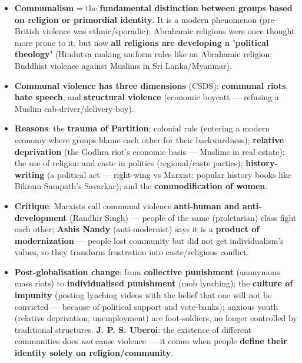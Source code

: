 \begin{KeyConcept}
\begin{itemize}
\item \textbf{Communalism} = the \textbf{fundamental distinction between groups based on religion or primordial identity}. It is a modern phenomenon (pre-British violence was ethnic/sporadic); Abrahamic religions were once thought more prone to it, but now \textbf{all religions are developing a 'political theology'} (Hindutva making uniform rules like an Abrahamic religion; Buddhist violence against Muslims in Sri Lanka/Myanmar).
\item \textbf{Communal violence has three dimensions} (CSDS): \textbf{communal riots}, \textbf{hate speech}, and \textbf{structural violence} (economic boycott --- refusing a Muslim cab-driver/delivery-boy).
\item \textbf{Reasons}: the \textbf{trauma of Partition}; colonial rule (entering a modern economy where groups blame each other for their backwardness); \textbf{relative deprivation} (the Godhra riot's economic basis --- Muslims in real estate); the use of religion and caste in politics (regional/caste parties); \textbf{history-writing} (a political act --- right-wing vs Marxist; popular history books like Bikram Sampath's Savarkar); and the \textbf{commodification of women}.
\item \textbf{Critique}: Marxists call communal violence \textbf{anti-human and anti-development} (Randhir Singh) --- people of the same (proletarian) class fight each other; \textbf{Ashis Nandy} (anti-modernist) says it is a \textbf{product of modernization} --- people lost community but did not get individualism's values, so they transform frustration into caste/religious conflict.
\item \textbf{Post-globalisation change}: from \textbf{collective punishment} (anonymous mass riots) to \textbf{individualised punishment} (mob lynching); the \textbf{culture of impunity} (posting lynching videos with the belief that one will not be convicted --- because of political support and vote-banks); anxious youth (relative deprivation, unemployment) are foot-soldiers, no longer controlled by traditional structures. \textbf{J. P. S. Uberoi}: the existence of different communities does \emph{not} cause violence --- it comes when people \textbf{define their identity solely on religion/community}.
\end{itemize}
\end{KeyConcept}

